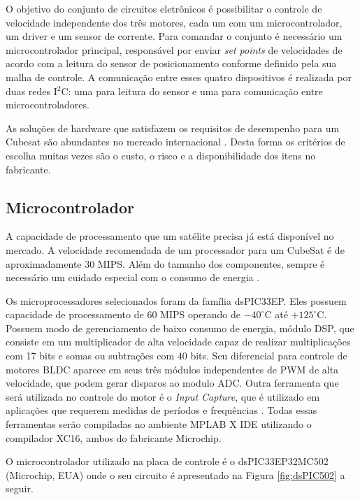 \documentclass[
	12pt,				%
	openany,			%
	twoside,			%
	a4paper,			%
	english,			%
	french,				%
	spanish,			%
	brazil,				%
	oldfontcommands
	]{abntex2}
\begin{document}
O objetivo do conjunto de circuitos eletrônicos é possibilitar o controle de velocidade independente dos três motores, cada um com um microcontrolador, um driver e um sensor de corrente. Para comandar o conjunto é necessário um microcontrolador principal, responsável por enviar \textit{set points} de velocidades de acordo com a leitura do sensor de posicionamento conforme definido pela sua malha de controle. A comunicação entre esses quatro dispositivos é realizada por duas redes I$^{2}$C: uma para leitura do sensor e uma para comunicação entre microcontroladores.

As soluções de hardware que satisfazem os requisitos de desempenho para um Cubesat são abundantes no mercado internacional \cite{STATEOFART}. Desta forma os critérios de escolha muitas vezes são o custo, o risco e a disponibilidade dos itens no fabricante.

\subsection{Microcontrolador}

A capacidade de processamento que um satélite precisa já está disponível no mercado. A velocidade recomendada de um processador para um CubeSat é de aproximadamente 30 MIPS. Além do tamanho dos componentes, sempre é necessário um cuidado especial com o consumo de energia \cite{STATEOFART}.

Os microprocessadores selecionados foram da família dsPIC33EP. Eles possuem capacidade de processamento de 60 MIPS operando de $-40^{\circ}$C até $+125^{\circ}$C. Possuem modo de gerenciamento de baixo consumo de energia, módulo DSP, que consiste em um multiplicador de alta velocidade capaz de realizar multiplicações com 17 bits e somas ou subtrações com 40 bits. Seu diferencial para controle de motores BLDC aparece em seus três módulos independentes de PWM de alta velocidade, que podem gerar disparos ao modulo ADC. Outra ferramenta que será utilizada no controle do motor é o \textit{Input Capture}, que é utilizado em aplicações que requerem medidas de períodos e frequências \cite{dsPIC33EP}. Todas essas ferramentas serão compiladas no ambiente MPLAB X IDE utilizando o compilador XC16, ambos do fabricante Microchip.

O microcontrolador utilizado na placa de controle é o dsPIC33EP32MC502 (Microchip, EUA) onde o seu circuito é apresentado na Figura \ref{fig:dsPIC502} a seguir. 
\end{document}
